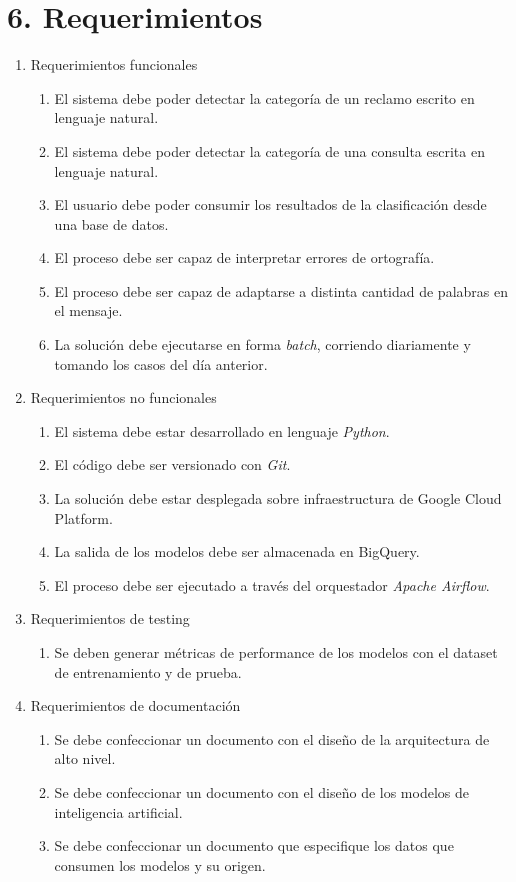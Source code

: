 \documentclass[
11pt, %
]{charter}
\begin{document}

\section{6. Requerimientos}
\label{sec:requerimientos}

\begin{enumerate}
	\item Requerimientos funcionales
		\begin{enumerate}
			\item El sistema debe poder detectar la categoría de un reclamo escrito en lenguaje natural.
			\item El sistema debe poder detectar la categoría de una consulta escrita en lenguaje natural.
			\item El usuario debe poder consumir los resultados de la clasificación desde una base de datos.
			\item El proceso debe ser capaz de interpretar errores de ortografía.
			\item El proceso debe ser capaz de adaptarse a distinta cantidad de palabras en el mensaje.
			\item La solución debe ejecutarse en forma \textit{batch}, corriendo diariamente y tomando los casos del día anterior.
		\end{enumerate}
	\item Requerimientos no funcionales
		\begin{enumerate}
			\item El sistema debe estar desarrollado en lenguaje \textit{Python}.
			\item El código debe ser versionado con \textit{Git}.
			\item La solución debe estar desplegada sobre infraestructura de Google Cloud Platform.
			\item La salida de los modelos debe ser almacenada en BigQuery.
			\item El proceso debe ser ejecutado a través del orquestador \textit{Apache Airflow}.
		\end{enumerate}
	\item Requerimientos de testing
		\begin{enumerate}
			\item Se deben generar métricas de performance de los modelos con el dataset de entrenamiento y de prueba.
		\end{enumerate}
	\item Requerimientos de documentación
		\begin{enumerate}
			\item Se debe confeccionar un documento con el diseño de la arquitectura de alto nivel.
			\item Se debe confeccionar un documento con el diseño de los modelos de inteligencia artificial.
			\item Se debe confeccionar un documento que especifique los datos que consumen los modelos y su origen.
		\end{enumerate}
\end{enumerate}
\end{document}
